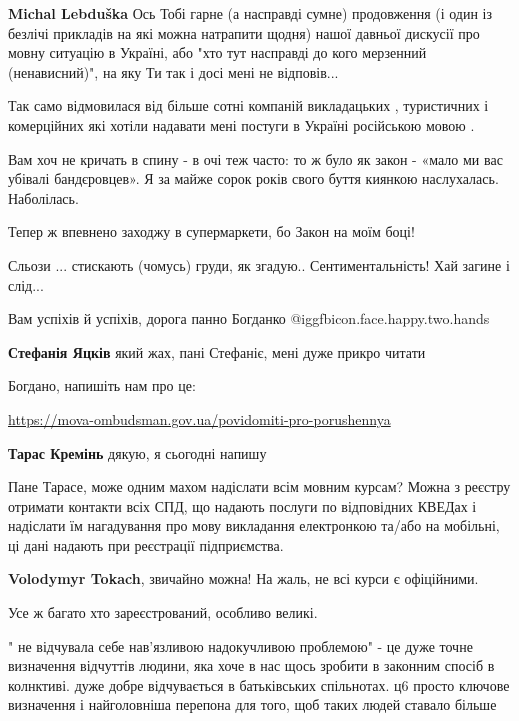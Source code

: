 \begin{itemize}
\textbf{Michal Lebduška} Ось Тобі гарне (а насправді сумне) продовження (і один
із безлічі прикладів на які можна натрапити щодня) нашої давньої дискусії про
мовну ситуацію в Україні, або "хто тут насправді до кого мерзенний
(ненависний)", на яку Ти так і досі мені не відповів...


Так само відмовилася від більше сотні компаній викладацьких , туристичних і
комерційних які хотіли надавати мені постуги в Україні російською мовою .


Вам хоч не кричать в спину - в очі теж часто: то ж було як закон - «мало ми вас
убівалі бандєровцев». Я за майже сорок років свого буття киянкою наслухалась.
Наболілась.

Тепер ж впевнено заходжу в супермаркети, бо Закон на моїм боці!

Сльози ... стискають (чомусь) груди, як згадую.. Сентиментальність! Хай загине і слід...

Вам успіхів й успіхів, дорога панно Богданко @igg{fbicon.face.happy.two.hands} 

\begin{itemize} %
\textbf{Стефанія Яцків} який жах, пані Стефаніє, мені дуже прикро читати
\end{itemize} %

Богдано, напишіть нам про це:\par 
\url{https://mova-ombudsman.gov.ua/povidomiti-pro-porushennya}

\begin{itemize} %
\textbf{Тарас Кремінь} дякую, я сьогодні напишу

Пане Тарасе, може одним махом надіслати всім мовним курсам?
Можна з реєстру отримати контакти всіх СПД, що надають послуги по відповідних КВЕДах і надіслати їм нагадування про мову викладання електронкою та/або на мобільні, ці дані надають при реєстрації підприємства.

\textbf{Volodymyr Tokach}, звичайно можна! На жаль, не всі курси є офіційними.

Усе ж багато хто зареєстрований, особливо великі.
\end{itemize} %


" не відчувала себе нав’язливою надокучливою проблемою" - це дуже точне
визначення відчуттів людини, яка хоче в нас щось зробити в законним спосіб в
колнктиві. дуже добре відчувається в батьківських спільнотах. ц6 просто ключове
визначення і найголовніша перепона для того, щоб таких людей ставало більше


\end{itemize}
